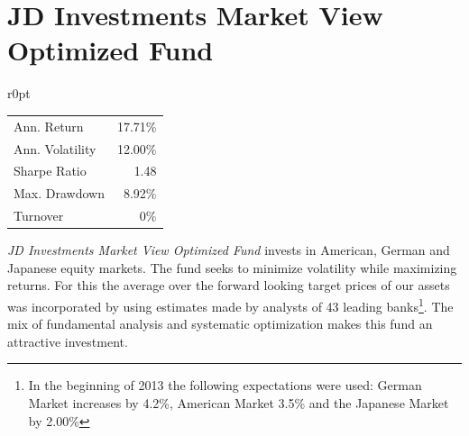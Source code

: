 \documentclass[11pt, parskip=full, DIV=14]{scrreprt}
\begin{document}
\newpage\section*{JD Investments Market View Optimized Fund}
\begin{mywraptable}{r}{0pt}
\begin{tabular}{lr}
\toprule
Ann. Return & 17.71\%\\
Ann. Volatility & 12.00\%\\
Sharpe Ratio & 1.48\\
Max. Drawdown & 8.92\% \\
Turnover & 0\%\\
\bottomrule
\end{tabular}
\end{mywraptable}
\textit{JD Investments Market View Optimized Fund} invests in American, German and Japanese equity markets.
The fund seeks to minimize volatility while maximizing returns.
For this the average over the forward looking target prices of our assets was incorporated by using estimates made by analysts of 43 leading banks\footnote{In the beginning of 2013 the following expectations were used: German Market increases by 4.2\%, American Market 3.5\% and the Japanese Market by 2.00\%}.
The mix of fundamental analysis and systematic optimization makes this fund an attractive investment.



\begin{figure}[H]
\end{figure}
\end{document}
